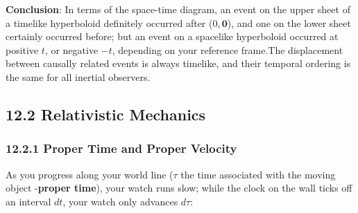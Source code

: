 \documentclass[11pt,letterpaper]{book}
\newcommand{\bm}[1]{\boldsymbol{#1}}
\begin{document}
\begin{enumerate}
\begin{center}
            \end{center}

             \textbf{Conclusion}: In terms of the space-time diagram, an event on the upper sheet of a timelike hyperboloid definitely occurred after (\( 0, \bm{0} \)), and one on the lower sheet certainly occurred before; but an event on a spacelike hyperboloid occurred at positive $t$, or negative $-t$, depending on your reference frame.The displacement between causally related events is always timelike, and their temporal ordering is the same for all inertial observers.
        \end{enumerate}

\subsection{12.2 Relativistic Mechanics}

    \subsubsection{12.2.1 Proper Time and Proper Velocity}      
        As you progress along your world line (\(\tau\) the time associated with the moving object -\textbf{proper time}), your watch runs slow; while the clock on the wall ticks off an interval \(dt\), your watch only advances \(d\tau\):
        
\end{document}
